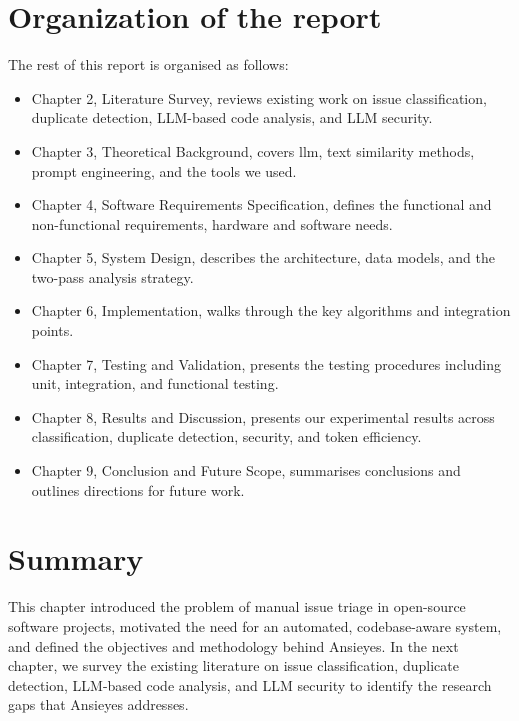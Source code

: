 \section{Organization of the report}

The rest of this report is organised as follows:
\begin{itemize}
\item Chapter 2, Literature Survey, reviews existing work on issue classification, duplicate detection, LLM-based code analysis, and LLM security.
\item Chapter 3, Theoretical Background, covers \gls{llm}, text similarity methods, prompt engineering, and the tools we used.
\item Chapter 4, Software Requirements Specification, defines the functional and non-functional requirements, hardware and software needs.
\item Chapter 5, System Design, describes the architecture, data models, and the two-pass analysis strategy.
\item Chapter 6, Implementation, walks through the key algorithms and integration points.
\item Chapter 7, Testing and Validation, presents the testing procedures including unit, integration, and functional testing.
\item Chapter 8, Results and Discussion, presents our experimental results across classification, duplicate detection, security, and token efficiency.
\item Chapter 9, Conclusion and Future Scope, summarises conclusions and outlines directions for future work.
\end{itemize}

\section{Summary}

This chapter introduced the problem of manual issue triage in open-source software projects, motivated the need for an automated, codebase-aware system, and defined the objectives and methodology behind Ansieyes. In the next chapter, we survey the existing literature on issue classification, duplicate detection, LLM-based code analysis, and LLM security to identify the research gaps that Ansieyes addresses.
